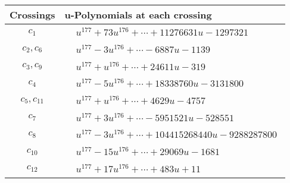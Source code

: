 \documentclass[1p]{elsarticle_modified}
\theoremstyle{definition}
\begin{document}
\begin{tabular}{m{50pt}|m{274pt}}
Crossings & \hspace{64pt}u-Polynomials at each crossing \\
\hline $$\begin{aligned}c_{1}\end{aligned}$$&$\begin{aligned}
&u^{177}+73 u^{176}+\cdots+11276631 u-1297321
\end{aligned}$\\
\hline $$\begin{aligned}c_{2},c_{6}\end{aligned}$$&$\begin{aligned}
&u^{177}-3 u^{176}+\cdots-6887 u-1139
\end{aligned}$\\
\hline $$\begin{aligned}c_{3},c_{9}\end{aligned}$$&$\begin{aligned}
&u^{177}+u^{176}+\cdots+24611 u-319
\end{aligned}$\\
\hline $$\begin{aligned}c_{4}\end{aligned}$$&$\begin{aligned}
&u^{177}-5 u^{176}+\cdots+18338760 u-3131800
\end{aligned}$\\
\hline $$\begin{aligned}c_{5},c_{11}\end{aligned}$$&$\begin{aligned}
&u^{177}+u^{176}+\cdots+4629 u-4757
\end{aligned}$\\
\hline $$\begin{aligned}c_{7}\end{aligned}$$&$\begin{aligned}
&u^{177}+3 u^{176}+\cdots-5951521 u-528551
\end{aligned}$\\
\hline $$\begin{aligned}c_{8}\end{aligned}$$&$\begin{aligned}
&u^{177}-3 u^{176}+\cdots+104415268440 u-9288287800
\end{aligned}$\\
\hline $$\begin{aligned}c_{10}\end{aligned}$$&$\begin{aligned}
&u^{177}-15 u^{176}+\cdots+29069 u-1681
\end{aligned}$\\
\hline $$\begin{aligned}c_{12}\end{aligned}$$&$\begin{aligned}
&u^{177}+17 u^{176}+\cdots+483 u+11
\end{aligned}$\\
\hline
\end{tabular}\\~\\
\end{document}
